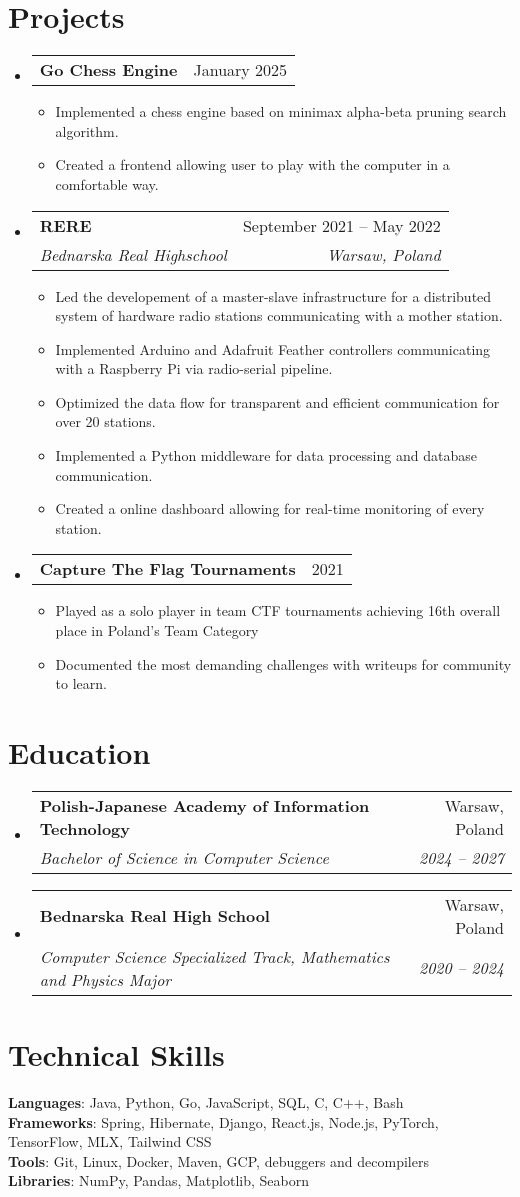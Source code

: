 \documentclass[letterpaper,11pt]{article}
\makeatletter
\newcommand{\resumeItem}[1]{
  \item\small{
    {#1 \vspace{-2pt}}
  }
}
\newcommand{\resumeSubheading}[4]{
  \vspace{-2pt}\item
    \begin{tabular*}{0.97\textwidth}[t]{l@{\extracolsep{\fill}}r}
      \textbf{#1} & #2 \\
      \textit{\small#3} & \textit{\small #4} \\
    \end{tabular*}\vspace{-7pt}
}
\newcommand{\resumeSubheadingNoDate}[2]{
  \vspace{-2pt}\item
    \begin{tabular*}{0.97\textwidth}[t]{l@{\extracolsep{\fill}}r}
      \textbf{#1} & #2 \\
    \end{tabular*}\vspace{-7pt}
}
\newcommand{\resumeSubHeadingListStart}{\begin{itemize}[leftmargin=0.15in, label={}]}
\newcommand{\resumeSubHeadingListEnd}{\end{itemize}}
\newcommand{\resumeItemListStart}{\begin{itemize}}
\newcommand{\resumeItemListEnd}{\end{itemize}\vspace{-5pt}}
\makeatother
\begin{document}
\section{Projects}
  \resumeSubHeadingListStart
    \resumeSubheadingNoDate
      {Go Chess Engine}{January 2025}
      \resumeItemListStart
        \resumeItem{Implemented a chess engine based on minimax alpha-beta pruning search algorithm.}
        \resumeItem{Created a frontend allowing user to play with the computer in a comfortable way.}
      \resumeItemListEnd
    \resumeSubheading
      {RERE}{September 2021 -- May 2022}
      {Bednarska Real Highschool}{Warsaw, Poland}
      \resumeItemListStart
        \resumeItem{Led the developement of a master-slave infrastructure for a distributed system of hardware radio stations communicating with a mother station.}
        \resumeItem{Implemented Arduino and Adafruit Feather controllers communicating with a Raspberry Pi via radio-serial pipeline.}
        \resumeItem{Optimized the data flow for transparent and efficient communication for over 20 stations.}
        \resumeItem{Implemented a Python middleware for data processing and database communication.}
        \resumeItem{Created a online dashboard allowing for real-time monitoring of every station.}
      \resumeItemListEnd
    \resumeSubheadingNoDate
      {Capture The Flag Tournaments}{2021}
      \resumeItemListStart
        \resumeItem{Played as a solo player in team CTF tournaments achieving 16th overall place in Poland's Team Category}
        \resumeItem{Documented the most demanding challenges with writeups for community to learn.}
      \resumeItemListEnd
  \resumeSubHeadingListEnd

\section{Education}
    \resumeSubHeadingListStart
      \resumeSubheading
        {Polish-Japanese Academy of Information Technology}{Warsaw, Poland}
        {Bachelor of Science in Computer Science}{2024 -- 2027}
      \resumeSubheading
        {Bednarska Real High School}{Warsaw, Poland}
        {Computer Science Specialized Track, Mathematics and Physics Major}{2020 -- 2024}
  \resumeSubHeadingListEnd


\section{Technical Skills}
  \begin{itemize}[leftmargin=0.15in, label={}]
    \small{\item{
      \textbf{Languages}{: Java, Python, Go, JavaScript, SQL, C, C++, Bash} \\
      \textbf{Frameworks}{: Spring, Hibernate, Django, React.js, Node.js, PyTorch, TensorFlow, MLX, Tailwind CSS} \\
      \textbf{Tools}{: Git, Linux, Docker, Maven,  GCP, debuggers and decompilers} \\
      \textbf{Libraries}{: NumPy, Pandas, Matplotlib, Seaborn} \\
    }}
  \end{itemize}

  
\end{document}
